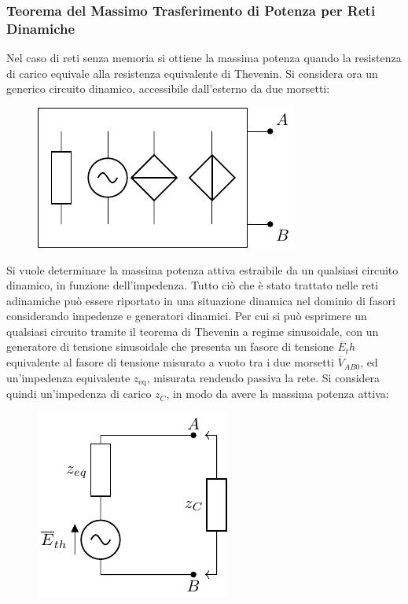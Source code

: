 \documentclass{article}
\numberwithin{equation}{subsection}
\begin{document}
\subsubsection{Teorema del Massimo Trasferimento di Potenza per Reti Dinamiche}

Nel caso di reti senza memoria si ottiene la massima potenza quando la resistenza di carico equivale alla resistenza equivalente di Thevenin. Si considera ora un generico 
circuito dinamico, accessibile dall'esterno da due morsetti:
\begin{figure}[H]%
    \centering
    \includegraphics{generico-circuito-dinamico.pdf}%
    \label{fig:generico-circuito-dinamico}
\end{figure}

Si vuole determinare la massima potenza attiva estraibile da un qualsiasi circuito dinamico, in funzione dell'impedenza. Tutto ciò che è stato trattato nelle reti adinamiche 
può essere riportato in una situazione dinamica nel dominio di fasori considerando impedenze e generatori dinamici. Per cui si può esprimere un qualsiasi circuito 
tramite il teorema di Thevenin a regime sinusoidale, con un generatore di tensione sinusoidale che presenta un fasore di tensione $\overline{E}_th$ equivalente al fasore 
di tensione misurato a vuoto tra i due morsetti $\overline{V}_{AB0}$, ed un'impedenza equivalente $z_\mathrm{eq}$, misurata rendendo passiva la rete. Si considera quindi un'impedenza 
di carico $z_C$, in modo da avere la massima potenza attiva:
\begin{figure}[H]%
    \centering
    \includegraphics{rappresentazione-thevenin-fasori-carico.pdf}%
    \label{fig:rappresentazione-thevenin-fasori-carico}
\end{figure}
\end{document}
